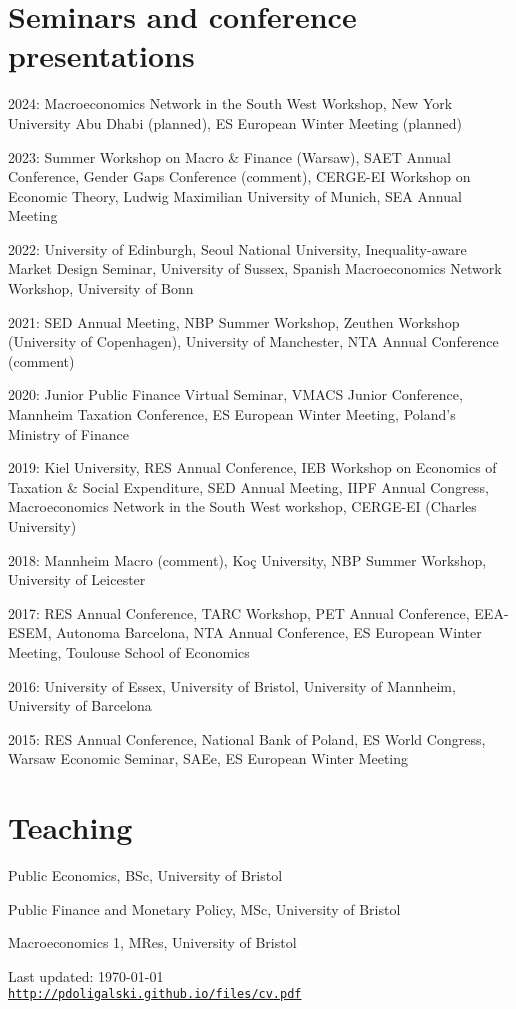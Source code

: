 \documentclass[letterpaper]{article}
\def\footerlink{http://pdoligalski.github.io/files/cv.pdf}
\renewenvironment{itemize}{
  \begin{list}{}{
    \setlength{\leftmargin}{1.5em}
  }
}{
  \end{list}
}
\begin{document}
\section*{Seminars and conference presentations}
\begin{itemize}
  \item 2024: Macroeconomics Network in the South West Workshop, New York University Abu Dhabi (planned), ES European Winter Meeting (planned)
  \item 2023: Summer Workshop on Macro \& Finance (Warsaw), SAET Annual Conference, Gender Gaps Conference (comment), CERGE-EI Workshop on Economic Theory, Ludwig Maximilian University of Munich, SEA Annual Meeting
  \item 2022: University of Edinburgh, Seoul National University, Inequality-aware Market Design Seminar, University of Sussex, Spanish Macroeconomics Network Workshop, University of Bonn
  \item 2021: SED Annual Meeting, NBP Summer Workshop, Zeuthen Workshop (University of Copenhagen), University of Manchester, NTA Annual Conference (comment) 
  \item 2020: Junior Public Finance Virtual Seminar, VMACS Junior Conference, Mannheim Taxation Conference, ES European Winter Meeting, Poland's Ministry of Finance
  \item 2019: Kiel University, RES Annual Conference, IEB Workshop on Economics of Taxation \& Social Expenditure, SED Annual Meeting, IIPF Annual Congress, Macroeconomics Network in the South West workshop, CERGE-EI (Charles University)
  \item 2018: Mannheim Macro (comment), Ko\c{c} University, NBP Summer Workshop, University of Leicester
  \item 2017: RES Annual Conference, TARC Workshop, PET Annual Conference, EEA-ESEM, Autonoma Barcelona, NTA Annual Conference, ES European Winter Meeting, Toulouse School of Economics
  \item 2016: University of Essex, University of Bristol, University of Mannheim, University of Barcelona
  \item 2015: RES Annual Conference, National Bank of Poland, ES World Congress, Warsaw Economic Seminar, SAEe, ES European Winter Meeting
\end{itemize}

\section*{Teaching}
\begin{itemize}
  \item Public Economics, BSc, University of Bristol
  \item Public Finance and Monetary Policy, MSc, University of Bristol
  \item Macroeconomics 1, MRes, University of Bristol
\end{itemize}

\bigskip

\begin{center}
  \begin{footnotesize}
    Last updated: \today \\
    \href{\footerlink}{\texttt{\footerlink}}
  \end{footnotesize}
\end{center}
\end{document}
